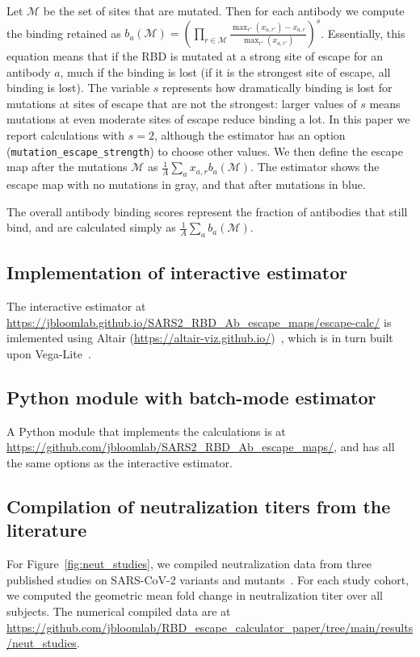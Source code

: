 \documentclass[9pt,twocolumn,twoside]{gsajnl_modified}
\begin{document}
{Let $\mathcal{M}$ be the set of sites that are mutated.
Then for each antibody we compute the binding retained as $b_a\left(\mathcal{M}\right) = \left(\prod\limits_{r \in \mathcal{M}} \frac{\max_{r'}\left(x_{a,r'}\right) - x_{a,r}}{\max_{r'}\left(x_{a,r'}\right)}\right)^s$. 
Essentially, this equation means that if the RBD is mutated at a strong site of escape for an antibody $a$, much if the binding is lost (if it is the strongest site of escape, all binding is lost).
The variable $s$ represents how dramatically binding is lost for mutations at sites of escape that are not the strongest: larger values of $s$ means mutations at even moderate sites of escape reduce binding a lot.
In this paper we report calculations with $s = 2$, although the estimator has an option (\texttt{mutation\_escape\_strength}) to choose other values.
We then define the escape map after the mutations $\mathcal{M}$ as $\frac{1}{A}\sum_a x_{a,r} b_a\left(\mathcal{M}\right)$.
The estimator shows the escape map with no mutations in gray, and that after mutations in blue.

The overall antibody binding scores represent the fraction of antibodies that still bind, and are calculated simply as $\frac{1}{A}\sum_a b_a\left(\mathcal{M}\right)$.

\subsection{Implementation of interactive estimator}
The interactive estimator at \url{https://jbloomlab.github.io/SARS2_RBD_Ab_escape_maps/escape-calc/} is imlemented using Altair (\url{https://altair-viz.github.io/})~\citep{VanderPlas2018}, which is in turn built upon Vega-Lite~\citep{Satyanarayan2017}.

\subsection{Python module with batch-mode estimator}
A Python module that implements the calculations is at \url{https://github.com/jbloomlab/SARS2_RBD_Ab_escape_maps/}, and has all the same options as the interactive estimator.

\subsection{Compilation of neutralization titers from the literature}
For Figure~\ref{fig:neut_studies}, we compiled neutralization data from three published studies on SARS-CoV-2 variants and mutants~\citep{lucas2021impact,uriu2021neutralization,wang2021antibody}.
For each study cohort, we computed the geometric mean fold change in neutralization titer over all subjects.
The numerical compiled data are at \url{https://github.com/jbloomlab/RBD_escape_calculator_paper/tree/main/results/neut_studies}.

}
\end{document}
